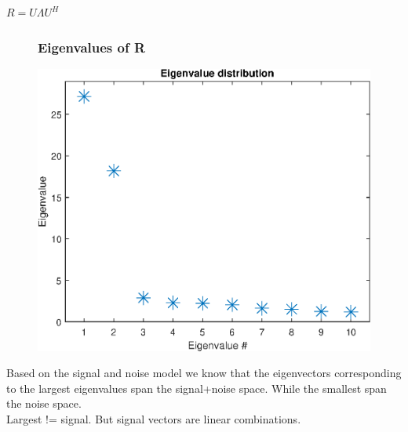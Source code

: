 \documentclass{beamer}
\begin{document}
\begin{frame}
	$R = U \Lambda U^H$
	\begin{figure}
    	\frametitle{Eigenvalues of R}
		\centering
    	\includegraphics[scale=0.4]{Eigenvalues.eps}\\
	\end{figure}
    Based on the signal and noise model we know that the eigenvectors corresponding to the 		 	largest eigenvalues span the signal+noise space. While the smallest span the noise space.\\
 	Largest != signal. But signal vectors are linear combinations.
\end{frame}
\end{document}
